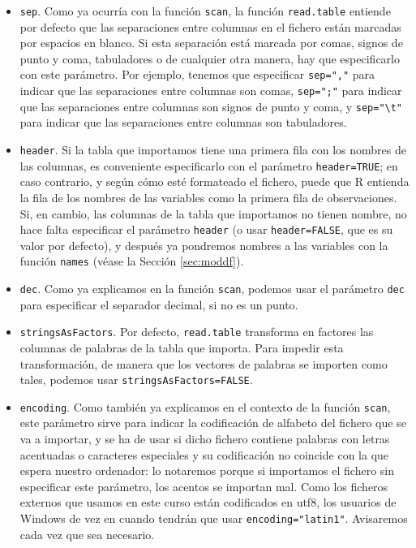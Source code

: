 \documentclass[]{book}
\theoremstyle{definition}
\theoremstyle{definition}
\theoremstyle{definition}
\theoremstyle{remark}
\begin{document}
\begin{itemize}
\item
  \texttt{sep}. Como ya ocurría con la función \texttt{scan}, la función \texttt{read.table} entiende por defecto que las separaciones entre columnas en el fichero están marcadas por espacios en blanco. Si esta separación está marcada por comas, signos de punto y coma, tabuladores o de cualquier otra manera, hay que especificarlo con este parámetro. Por ejemplo, tenemos que especificar \texttt{sep=","} para indicar que las separaciones entre columnas son comas, \texttt{sep=";"} para indicar que las separaciones entre columnas son signos de punto y coma, y \texttt{sep="\textbackslash{}t"} para indicar que las separaciones entre columnas son tabuladores.
\item
  \texttt{header}. Si la tabla que importamos tiene una primera fila con los nombres de las columnas, es conveniente especificarlo con el parámetro \texttt{header=TRUE}; en caso contrario, y según cómo esté formateado el fichero, puede que R entienda la fila de los nombres de las variables como la primera fila de observaciones.
  Si, en cambio, las columnas de la tabla que importamos no tienen nombre, no hace falta especificar el parámetro \texttt{header} (o usar \texttt{header=FALSE}, que es su valor por defecto), y después ya pondremos nombres a las variables con la función \texttt{names} (véase la Sección \ref{sec:moddf}).
\item
  \texttt{dec}. Como ya explicamos en la función \texttt{scan}, podemos usar el parámetro \texttt{dec} para especificar el separador decimal, si no es un punto.
\item
  \texttt{stringsAsFactors}. Por defecto, \texttt{read.table} transforma en factores las columnas de palabras de la tabla que importa. Para impedir esta transformación, de manera que los vectores de palabras se importen como tales, podemos usar \texttt{stringsAsFactors=FALSE}.
\item
  \texttt{encoding}. Como también ya explicamos en el contexto de la función \texttt{scan}, este parámetro sirve para indicar la codificación de alfabeto del fichero que se va a importar, y se ha de usar si dicho fichero contiene palabras con letras acentuadas o caracteres especiales y su codificación no coincide con la que espera nuestro ordenador: lo notaremos porque si importamos el fichero sin especificar este parámetro, los acentos se importan mal. Como los ficheros externos que usamos en este curso están codificados en utf8, los usuarios de Windows de vez en cuando tendrán que usar \texttt{encoding="latin1"}. Avisaremos cada vez que sea necesario.
\end{itemize}
\end{document}
